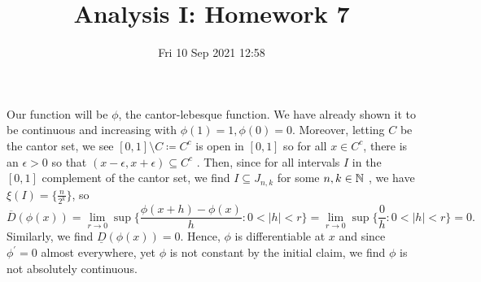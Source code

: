 \documentclass[a4paper]{article}
\title{Analysis I: Homework 7}
\date{Fri 10 Sep 2021 12:58}
\begin{document}
\maketitle
\begin{problem}[36]
	Our function will be \(\phi\), the cantor-lebesque function. We have already shown it to be continuous and increasing with \(\phi\left( 1 \right) = 1, \phi\left( 0 \right) = 0\). Moreover, letting \(C\) be the cantor set, we see \(\left[ 0, 1 \right] \setminus C \coloneqq C ^{c}\) is open in \(\left[ 0, 1 \right] \) so for all \(x \in C ^{c} \), there is an \(\epsilon > 0\) so that \(\left( x-\epsilon, x+\epsilon \right) \subseteq C ^{c}\) . Then, since for all intervals \(I \)  in the \(\left[ 0, 1 \right] \) complement of the cantor set, we find  \(I \subseteq J_{n, k}\) for some \(n, k \in \mathbb{N}\)  , we have \(\xi(I) = \{\frac{n}{2^{k}}\} \), so \[\overline{D}\left( \phi\left( x \right)  \right)  = \lim_{r \to 0}\sup \{ \frac{ \phi\left( x+h \right) -  \phi\left( x \right) }{h} : 0 < \left| h \right|  < r   \} = \lim_{r \to 0}\sup \{ \frac{0}{h} : 0 < \left| h \right|  <  r\} = 0  .\] Similarly, we find \( \underline{D}  \left( \phi\left( x \right)  \right) = 0\). Hence, \( \phi\) is differentiable at \(x\) and since \( \phi^{\prime} = 0\) almost everywhere, yet \( \phi\) is not constant by the initial claim, we find \( \phi\) is not absolutely continuous.
\end{problem}
\end{document}

